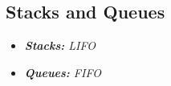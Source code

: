 \subsection{Stacks and Queues}

\begin{itemize}
	\item \emph{\textbf{Stacks:} LIFO}
	\item \emph{\textbf{Queues:} FIFO}
\end{itemize}